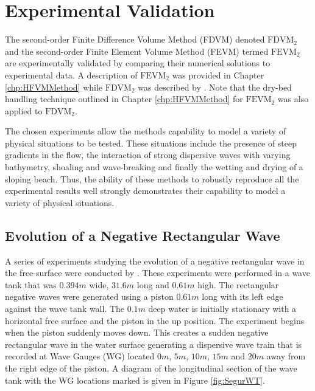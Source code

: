 
\chapter{Experimental Validation}
\label{chp:ExpMethodComp}

The second-order Finite Difference Volume Method (FDVM) denoted $\text{FDVM}_2$ and the second-order Finite Element Volume Method (FEVM) termed $\text{FEVM}_2$ are experimentally validated by comparing their numerical solutions to experimental data. A description of $\text{FEVM}_2$ was provided in Chapter \ref{chp:HFVMMethod} while $\text{FDVM}_2$ was described by \citet{Zoppou-etal-2017}. Note that the dry-bed handling technique outlined in Chapter \ref{chp:HFVMMethod} for $\text{FEVM}_2$ was also applied to $\text{FDVM}_2$. 

The chosen experiments allow the methods capability to model a variety of physical situations to be tested. These situations include the presence of steep gradients in the flow, the interaction of strong dispersive waves with varying bathymetry, shoaling and wave-breaking and finally the wetting and drying of a sloping beach. Thus, the ability of these methods to robustly reproduce all the experimental results well strongly demonstrates their capability to model a variety of physical situations. 

\section{Evolution of a Negative Rectangular Wave}
A series of experiments studying the evolution of a negative rectangular wave in the free-surface were conducted by \citet{Hammack-Segur-1978-337}. These experiments were performed in a wave tank that was $0.394m$ wide, $31.6m$ long and $0.61m$ high. The rectangular negative waves were generated using a piston $0.61m$ long with its left edge against the wave tank wall. The $0.1m$ deep water is initially stationary with a horizontal free surface and the piston in the up position. The experiment begins when the piston suddenly moves down. This creates a sudden negative rectangular wave in the water surface generating a dispersive wave train that is recorded at Wave Gauges (WG) located $0m$, $5m$, $10m$, $15m$ and $20m$ away from the right edge of the piston. A diagram of the longitudinal section of the wave tank with the WG locations marked is given in Figure \ref{fig:SegurWT}.

